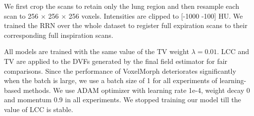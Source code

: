 \documentclass[runningheads]{llncs}
\begin{document}
We first crop the scans to retain only the lung region and then resample each scan to 256 $\times$ 256 $\times$ 256 voxels. Intensities are clipped to [-1000 -100] HU. We trained the RRN over the whole dataset to register full expiration scans to their corresponding full inspiration scans. 

All models are trained with the same value of the TV weight $\lambda=0.01$. LCC and TV are applied to the DVFs generated by the final field estimator for fair comparisons. Since the performance of VoxelMorph deteriorates significantly when the batch is large, we use a batch size of 1 for all experiments of learning-based methods. We use ADAM optimizer with learning rate 1e-4, weight decay 0 and momentum 0.9 in all experiments. We stopped training our model till the value of LCC is stable. 
\end{document}
